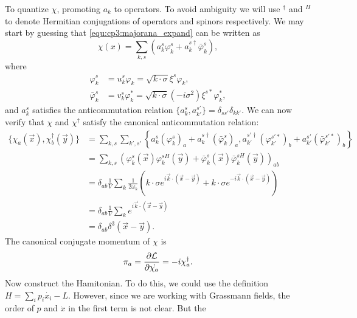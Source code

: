 \begin{problembody}
\begin{subequations}
    \end{subequations}
    To quantize $\chi$, promoting $a_k$ to operators. To avoid ambiguity we will use ${}^\dagger$ and ${}^H$ to denote Hermitian conjugations of
    operators and spinors respectively. We may start by guessing that \eqref{equ:cp3:majorana_expand} can be written as
    \begin{equation}\label{equ:cp3:majorana_expand_q}
        \chi(x) = \sum_{k, s} \left(a_k^s \varphi_k^s + a_k^{s\dagger} \bar{\varphi}_k^s\right),
    \end{equation}
    where
    \begin{subequations}
        \begin{align}
            \varphi_k^s & = u_k^s \varphi_k = \sqrt{k\cdot\sigma}\xi^s \varphi_k,\\
            \bar{\varphi}_k^s & = v_k^s \varphi_k^\ast = \sqrt{k\cdot\sigma} (-i\sigma^2) \xi^{s\ast} \varphi_k^\ast,
        \end{align}
    \end{subequations}
    and $a_k^s$ satisfies the anticommutation relation $\{a_k^s, a_{k'}^{s'}\} = \delta_{ss'}\delta_{kk'}$. We can now verify that $\chi$ and $\chi^\dagger$ satisfy the canonical anticommutation relation: 
    \begin{align*}
        \{\chi_a(\vec{x}), \chi_b^\dagger(\vec{y})\} & = \sum_{k, s}\sum_{k', s'}\left\{a_k^s(\varphi_k^s)_a + a_k^{s\dagger}(\bar{\varphi}_k^s)_a, a_{k'}^{s'\dagger}(\varphi_{k'}^{s'\ast})_b + a_{k'}^{s'}(\bar{\varphi}_{k'}^{s'\ast})_b\right\}\\
        & = \sum_{k, s}\left(\varphi_k^s(\vec{x})\varphi_k^{sH}(\vec{y}) + \bar{\varphi}_k^s(\vec{x})\bar{\varphi}_k^{sH}(\vec{y})\right)_{ab}\\
        & = \delta_{ab} \frac{1}{V}\sum_k\frac{1}{2\omega_k}\left(k\cdot\sigma e^{i\vec{k}\cdot(\vec{x} - \vec{y})} + k\cdot\sigma e^{-i\vec{k}\cdot(\vec{x} - \vec{y})}\right)\\
        & = \delta_{ab} \frac{1}{V}\sum_k e^{i\vec{k}\cdot(\vec{x} - \vec{y})}\\
        & = \delta_{ab}\delta^3(\vec{x} - \vec{y}).
    \end{align*}
    The canonical conjugate momentum of $\chi$ is
    \begin{equation*}
        \pi_a = \frac{\partial \mathcal{L}}{\partial \dot{\chi_a}} = -i\chi_a^\dagger.
    \end{equation*}
    Now construct the Hamitonian. To do this, we could use the definition $H = \sum_i p_i\dot{x_i} - L$. However, since we are working with Grassmann fields, the order of $p$ and $\dot{x}$ in the first term is not clear. But the

\end{problembody}

